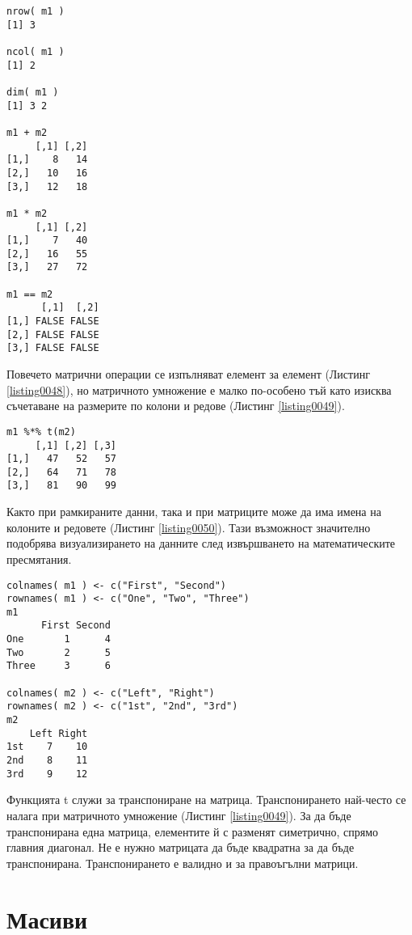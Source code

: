 \begin{lstlisting}[caption=Операции с матрици, label=listing0048]
nrow( m1 )
[1] 3

ncol( m1 )
[1] 2

dim( m1 )
[1] 3 2

m1 + m2
     [,1] [,2]
[1,]    8   14
[2,]   10   16
[3,]   12   18
 
m1 * m2
     [,1] [,2]
[1,]    7   40
[2,]   16   55
[3,]   27   72

m1 == m2
      [,1]  [,2]
[1,] FALSE FALSE
[2,] FALSE FALSE
[3,] FALSE FALSE
\end{lstlisting}

Повечето матрични операции се изпълняват елемент за елемент (Листинг \ref{listing0048}), но матричното умножение е малко по-особено тъй като изисква съчетаване на размерите по колони и редове (Листинг \ref{listing0049}).

\begin{lstlisting}[caption=Матрично умножение, label=listing0049]
m1 %*% t(m2)
     [,1] [,2] [,3]
[1,]   47   52   57
[2,]   64   71   78
[3,]   81   90   99
\end{lstlisting}

Както при рамкираните данни, така и при матриците може да има имена на колоните и редовете (Листинг \ref{listing0050}). Тази възможност значително подобрява визуализирането на данните след извършването на математическите пресмятания. 

\begin{lstlisting}[caption=Имена на колоните и редовете, label=listing0050]
colnames( m1 ) <- c("First", "Second")
rownames( m1 ) <- c("One", "Two", "Three")
m1
      First Second
One       1      4
Two       2      5
Three     3      6

colnames( m2 ) <- c("Left", "Right")
rownames( m2 ) <- c("1st", "2nd", "3rd")
m2
    Left Right
1st    7    10
2nd    8    11
3rd    9    12
\end{lstlisting}

Функцията t служи за транспониране на матрица. Транспонирането най-често се налага при матричното умножение (Листинг \ref{listing0049}). За да бъде транспонирана една матрица, елементите й с разменят симетрично, спрямо главния диагонал. Не е нужно матрицата да бъде квадратна за да бъде транспонирана. Транспонирането е валидно и за правоъгълни матрици. 

\section{Масиви}


